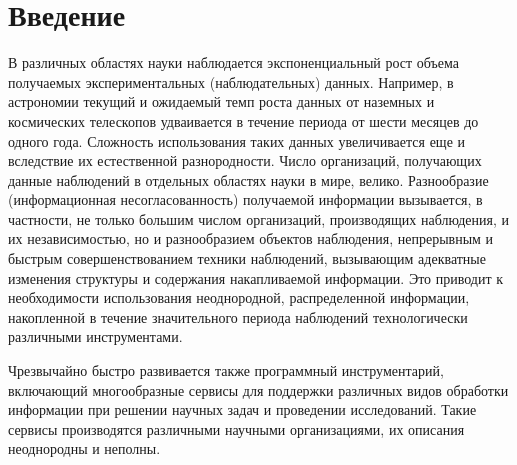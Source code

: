       \begin{multicols}{2}

      \label{st\stat}

\section{Введение}
\vspace*{-1pt}

     В различных областях науки наблюдается экспоненциальный рост объема
получаемых экспериментальных (наблюдательных) данных. Например, в астрономии
текущий и ожидаемый темп роста данных от наземных и космических телескопов
удваивается в течение периода от шести месяцев до одного года. Сложность
использования таких данных увеличивается еще и вследствие их естественной
разнородности. Число организаций, получающих данные наблюдений в отдельных
областях науки в мире, велико. Разнообразие (информационная несогласованность)
получаемой информации вызывается, в частности, не только большим числом
организаций, производящих наблюдения, и их независимостью, но и разнообразием
объектов наблюдения, непрерывным и быст\-рым совер\-шен\-ст\-во\-ва\-ни\-ем техники
наблюдений, вызывающим адекватные изменения структуры и содержания
накапливаемой информации. Это приводит к необходимости использования
неоднородной, распределенной информации, накопленной в течение значительного
периода наблюдений технологически различными инструментами.

     Чрезвычайно быстро развивается также программный инструментарий,
включающий многообразные сервисы для поддержки различных видов обработки
информации при решении научных задач и проведении исследований. Такие сервисы
производятся различными научными организациями, их описания неоднородны и
неполны.


\end{multicols}
